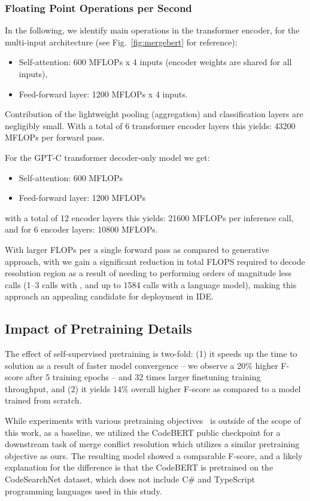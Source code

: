 \subsubsection{Floating Point Operations per Second}
In the following, we identify main operations in the transformer encoder, for the multi-input \thistool{} architecture (see Fig.~\ref{fig:mergebert} for reference):
\begin{itemize}
    \item Self-attention: 600 MFLOPs x 4 inputs (encoder weights are shared for all inputs),
    \item Feed-forward layer: 1200 MFLOPs x 4 inputs. 
\end{itemize}
Contribution of the lightweight pooling (aggregation) and classification layers are negligibly small.
With a total of 6 transformer encoder layers this yields: 43200 MFLOPs per forward pass.

For the GPT-C transformer decoder-only model we get:
\begin{itemize}
    \item Self-attention: 600 MFLOPs 
    \item Feed-forward layer: 1200 MFLOPs 
\end{itemize}
with a total of 12 encoder layers this yields: 21600 MFLOPs per inference call, and for 6 encoder layers: 10800 MFLOPs.

With larger FLOPs per a single forward pass as compared to generative approach, with \thistool{} we gain a significant reduction in total FLOPS required to decode resolution region as a result of needing to performing orders of magnitude less calls (1--3 calls with \thistool{}, and up to 1584 calls with a language model), making this approach an appealing candidate for deployment in IDE.
\fi

\iffalse
\subsection{Impact of Pretraining Details}
\label{sec:codebert}

The effect of self-supervised pretraining is two-fold: (1) it speeds up the time to solution as a result of faster model convergence -- we observe a 20\% higher F-score after 5 training epochs -- and 32 times larger finetuning training throughput, and (2) it yields 14\% overall higher F-score as compared to a model trained from scratch.

While experiments with various pretraining objectives~\citep{graphcodebert, DOBF} is outside of the scope of this work, as a baseline, we utilized the CodeBERT public checkpoint for a downstream task of merge conflict resolution which utilizes a similar pretraining objective as ours. The resulting model showed a comparable F-score, and a likely explanation for the difference is that the CodeBERT is pretrained on the CodeSearchNet dataset, which does not include C\# and TypeScript programming languages used in this study.

